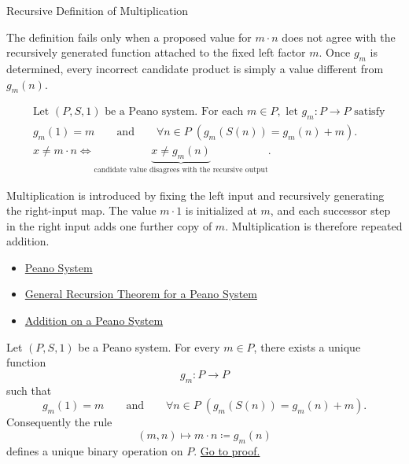 \begin{topicbox}{Recursive Definition of Multiplication}
\begin{remark*}
The definition fails only when a proposed value for $m \cdot n$ does not agree
with the recursively generated function attached to the fixed left factor $m$.
Once $g_m$ is determined, every incorrect candidate product is simply a value
different from $g_m(n)$.
\end{remark*}

\begin{remark*}
\[
\begin{aligned}
&\text{Let } (P,S,1) \text{ be a Peano system. For each } m \in P,
\text{ let } g_m : P \to P \text{ satisfy}\\
&g_m(1)=m
\qquad\text{and}\qquad
\forall n \in P\;(g_m(S(n))=g_m(n)+m).\\
&x \neq m \cdot n
\Longleftrightarrow
\underbrace{x \neq g_m(n)}_{\text{candidate value disagrees with the recursive output}}.
\end{aligned}
\]
\end{remark*}

\begin{remark*}[Interpretation]
Multiplication is introduced by fixing the left input and recursively
generating the right-input map. The value $m \cdot 1$ is initialized at $m$,
and each successor step in the right input adds one further copy of $m$.
Multiplication is therefore repeated addition.
\end{remark*}

\begin{dependencies}
\begin{itemize}
  \item \hyperref[def:peano-system]{Peano System}
  \item \hyperref[thm:general-recursion-theorem-for-peano-system]{General Recursion Theorem for a Peano System}
  \item \hyperref[def:addition-on-peano-system]{Addition on a Peano System}
\end{itemize}
\end{dependencies}

\begin{tcolorbox}[colback=thmbox, colframe=thmborder, arc=2pt,
  left=6pt, right=6pt, top=4pt, bottom=4pt,
  title={\small\textbf{Theorem (Multiplication Is Well-Defined on a Peano System)}},
  fonttitle=\small\bfseries]
\begin{theorem}
\label{thm:multiplication-well-defined-on-peano-system}
Let $(P,S,1)$ be a Peano system. For every $m \in P$, there exists a unique
function
\[
g_m : P \to P
\]
such that
\[
g_m(1)=m
\qquad\text{and}\qquad
\forall n \in P\;(g_m(S(n))=g_m(n)+m).
\]
Consequently the rule
\[
(m,n) \longmapsto m \cdot n \coloneqq g_m(n)
\]
defines a unique binary operation on $P$.
\hyperref[prf:multiplication-well-defined-on-peano-system]{Go to proof.}
\end{theorem}
\end{tcolorbox}


\end{topicbox}

